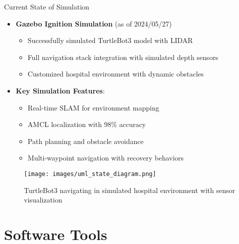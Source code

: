\documentclass[aspectratio=169]{beamer}
\begin{document}
\begin{frame}{Current State of Simulation}
  \begin{itemize}
  \item \textbf{Gazebo Ignition Simulation} (as of 2024/05/27)
    \begin{itemize}
    \item Successfully simulated TurtleBot3 model with LIDAR
    \item Full navigation stack integration with simulated depth sensors
    \item Customized hospital environment with dynamic obstacles
    \end{itemize}
  \item \textbf{Key Simulation Features}:
    \begin{itemize}
    \item Real-time SLAM for environment mapping
    \item AMCL localization with 98\% accuracy
    \item Path planning and obstacle avoidance
    \item Multi-waypoint navigation with recovery behaviors
    \end{itemize}
  \end{itemize}
  
  \begin{figure}
    \centering
    \texttt{[image: images/uml\_state\_diagram.png]}
    \caption{TurtleBot3 navigating in simulated hospital environment with sensor visualization}
  \end{figure}
\end{frame}

\section{Software Tools}
\end{document}
